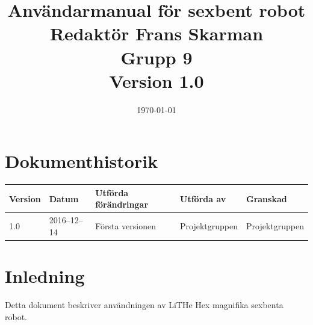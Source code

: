 \documentclass[a4paper,titlepage,12pt]{article}
\begin{document}
\listoftodos
	\title{\LARGE
		\textbf{Användarmanual för sexbent robot} \\
		\vspace*{0.5\baselineskip}
		\large
		Redaktör Frans Skarman \\
		Grupp 9 \\
		\small
		\vspace*{0.5\baselineskip}
		Version 1.0}

	\date{\today}

	\maketitle
	
	\newpage

	\tableofcontents
	\newpage



	\section*{Dokumenthistorik}
	\renewcommand*{\arraystretch}{1.4}
    \begin{longtable}[c]{ l l >{\raggedright}p{5cm} >{\raggedright}p{3cm} l }
		\textbf{Version} & \textbf{Datum} & \textbf{Utförda förändringar} 
		& \textbf{Utförda av} & \textbf{Granskad} \\ \midrule
		
	    1.0 & 2016--12--14 & Första versionen & Projektgruppen &
        Projektgruppen \\
            
	\end{longtable}


	\newpage

	\raggedright

	\section{Inledning}
	Detta dokument beskriver användningen av LiTHe Hex magnifika sexbenta robot.

	
\end{document}
